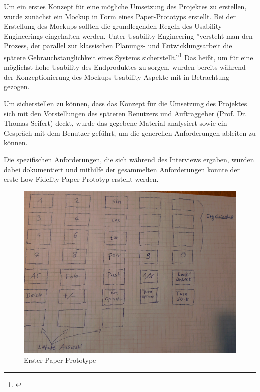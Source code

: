 Um ein erstes Konzept für eine mögliche Umsetzung des Projektes zu erstellen, wurde zunächst ein Mockup in Form eines Paper-Prototyps erstellt. Bei der Erstellung des Mockups sollten die grundlegenden Regeln des Usability Engineerings eingehalten werden. Unter Usability Engineering ''versteht man den Prozess, der parallel zur klassischen Planungs- und Entwicklungsarbeit die spätere Gebrauchstauglichkeit eines Systems sicherstellt.''\footnote{\cite[][S.~204]{handbuchusability2007}} Das heißt, um für eine möglichst hohe Usability des Endproduktes zu sorgen, wurden bereits während der Konzeptionierung des Mockups Usability Aspekte mit in Betrachtung gezogen. 

Um sicherstellen zu können, dass das Konzept für die Umsetzung des Projektes sich mit den Vorstellungen des späteren Benutzers und Auftraggeber (Prof. Dr. Thomas Seifert) deckt, wurde das gegebene Material analysiert sowie ein Gespräch mit dem Benutzer geführt, um die generellen Anforderungen ableiten zu können. 

Die spezifischen Anforderungen, die sich während des Interviews ergaben, wurden dabei dokumentiert und mithilfe der gesammelten Anforderungen konnte der erste Low-Fidelity Paper Prototyp erstellt werden.


\begin{figure}[!h]
	\includegraphics[width=1\columnwidth]{img/planung-mockup-erster-mockup}
	\caption[Erster Paper Prototype]{Erster Paper Prototype\footnotemark}
\end{figure}

